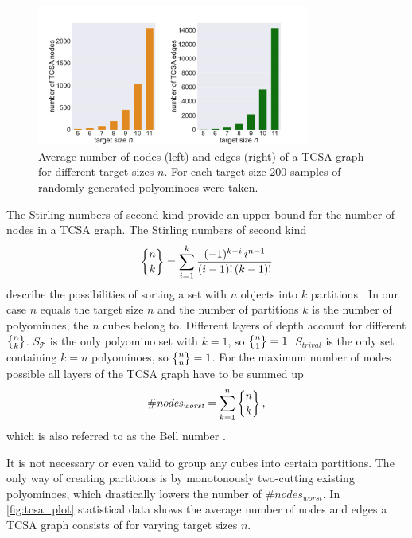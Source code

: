 \begin{figure}
	\centering
	\includegraphics[width=0.8\textwidth]{figures/plots/tcsa_nodes_edges.pdf}
	\caption[Average two-cut-sub-assembly nodes and edges for target size $n$.]{Average number of nodes (left) and edges (right) of a TCSA graph for different target sizes $n$.
		For each target size $200$ samples of randomly generated polyominoes were taken.}
	\label{fig:tcsa_plot}
\end{figure}

The Stirling numbers of second kind provide an upper bound for the number of nodes in a TCSA graph.
The Stirling numbers of second kind
\begin{equation}
\bracenom{n}{k} = \sum_{i=1}^{k} \frac{(-1)^{k-i} \, i^{n-1}}{(i-1)! \, (k-1)!}
\end{equation}
describe the possibilities of sorting a set with $n$ objects into $k$ partitions \cite{jelliss1991}.
In our case $n$ equals the target size $n$ and the number of partitions $k$ is the number of polyominoes, the $n$ cubes belong to.
Different layers of depth account for different $\bracenom{n}{k}$.
$S_\mathcal{T}$ is the only polyomino set with $k=1$, so $\bracenom{n}{1} = 1$.
$S_{trival}$ is the only set containing $k=n$ polyominoes, so $\bracenom{n}{n} = 1$.
For the maximum number of nodes possible all layers of the TCSA graph have to be summed up
\begin{equation}
\#\textit{nodes}_\textit{worst} = \sum_{k=1}^{n} \bracenom{n}{k} \, ,
\end{equation}
which is also referred to as the Bell number \cite{jelliss1991}.

It is not necessary or even valid to group any cubes into certain partitions.
The only way of creating partitions is by monotonously two-cutting existing polyominoes, which drastically lowers the number of $\#\textit{nodes}_\textit{worst}$.
In \autoref{fig:tcsa_plot} statistical data shows the average number of nodes and edges a TCSA graph consists of for varying target sizes $n$.

